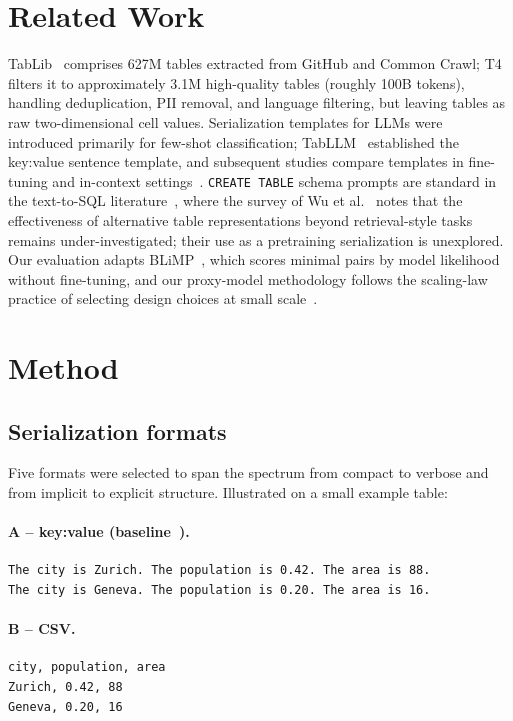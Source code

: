 \documentclass[11pt,a4paper]{article}
\begin{document}
\section{Related Work}
TabLib~\cite{tablib} comprises 627M tables extracted from GitHub and Common Crawl; T4~\cite{t4} filters it to approximately 3.1M high-quality tables (roughly 100B tokens), handling deduplication, PII removal, and language filtering, but leaving tables as raw two-dimensional cell values. Serialization templates for LLMs were introduced primarily for few-shot classification; TabLLM~\cite{tabllm} established the key:value sentence template, and subsequent studies compare templates in fine-tuning and in-context settings~\cite{jaitly,wang,ono}. \texttt{CREATE TABLE} schema prompts are standard in the text-to-SQL literature~\cite{spider,wu2025}, where the survey of Wu et al.~\cite{wu2025} notes that the effectiveness of alternative table representations beyond retrieval-style tasks remains under-investigated; their use as a pretraining serialization is unexplored. Our evaluation adapts BLiMP~\cite{blimp}, which scores minimal pairs by model likelihood without fine-tuning, and our proxy-model methodology follows the scaling-law practice of selecting design choices at small scale~\cite{chinchilla}.
\section{Method}
\label{sec:design}
\subsection{Serialization formats}
Five formats were selected to span the spectrum from compact to verbose and from implicit to explicit structure. Illustrated on a small example table:
\paragraph{A -- key:value (baseline~\cite{tabllm,t4}).}\mbox{}
\begin{lstlisting}
The city is Zurich. The population is 0.42. The area is 88.
The city is Geneva. The population is 0.20. The area is 16.
\end{lstlisting}
\paragraph{B -- CSV.}\mbox{}
\begin{lstlisting}
city, population, area
Zurich, 0.42, 88
Geneva, 0.20, 16
\end{lstlisting}
\end{document}
